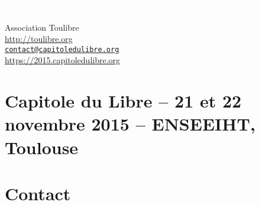 \documentclass{cdl_sponsor}
\begin{document}
\thispagestyle{empty} %



\parbox[t]{1.0\textwidth}{
	\flushright \fontsize{44pt}{56pt}\selectfont %

	\textcolor{white}{
		\hfill \textsc{Capitole du Libre 2015} \\
		\fontsize{36pt}{48pt}\selectfont{
      \hfill 21 et 22 novembre 2015 \\
    }
		\fontsize{24pt}{36pt}
	}
	\par

}




	

\vfill %

{\centering \large
\hfill Association Toulibre \\
\hfill \url{http://toulibre.org} \\
\hfill \href{mailto:contact@capitoledulibre.org}{\texttt{contact@capitoledulibre.org}} \\
\hfill \url{https://2015.capitoledulibre.org} \\
}


\section{Capitole du Libre {\small -- 21 et 22 novembre 2015 -- ENSEEIHT, Toulouse}}

	



\section{Contact}

	
\end{document}
